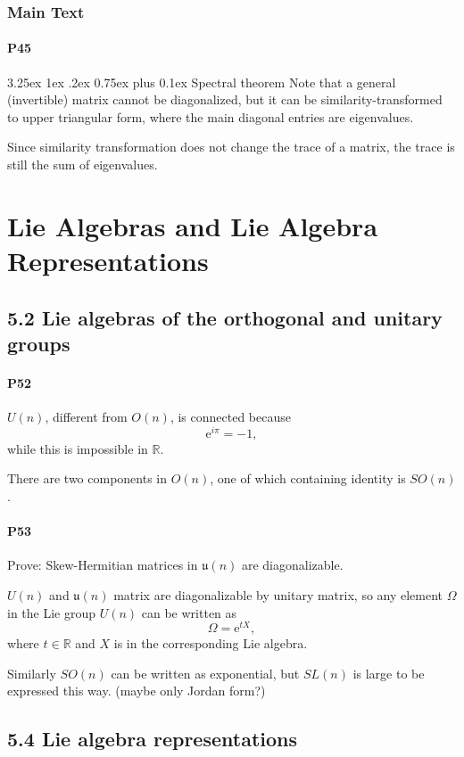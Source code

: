 \documentclass[12pt, letterpaper]{article}
\makeatletter
\renewcommand\subparagraph{\@startsection{subparagraph}{5}{\parindent}%
	{3.25ex \@plus1ex \@minus .2ex}%
	{0.75ex plus 0.1ex}%
	{\normalfont\normalsize\bfseries}}
\newcommand{\re}{\mathbb{R}}
\newcommand{\ee}{\mathrm{e}}
\newcommand{\red}[1]{{\color{red} #1}}
\newcommand{\blue}[1]{{\color{blue} #1}}
\theoremstyle{definition}
\theoremstyle{remark}
\theoremstyle{definition}
\theoremstyle{plain}
\makeatother
\begin{document}
	\subsubsection*{Main Text}

	\paragraph{P45}
	\subparagraph{Spectral theorem}
	\blue{Note that a general (invertible) matrix cannot be diagonalized}, but it can be similarity-transformed to upper triangular form,
	where the main diagonal entries are eigenvalues.
	
	Since similarity transformation does not change the trace of a matrix, the trace is still the sum of eigenvalues.
	
	\section{Lie Algebras and Lie Algebra Representations}
	\subsection*{5.2 Lie algebras of the orthogonal and unitary groups}
	\paragraph{P52}
	
	$U(n)$, different from $O(n)$, is connected because
	\[\ee^{i\pi}=-1, \]
	while this is impossible in $\re$.
	
	There are two components in $O(n)$, one of which containing identity is $SO(n)$.
	
	\paragraph{P53}
	
	\red{Prove: Skew-Hermitian matrices in $\mathfrak{u}(n)$ are diagonalizable.}
	
	$U(n)$ and $\mathfrak{u}(n)$ matrix are diagonalizable by unitary matrix, %
	so any element $\Omega$ in the Lie group $U(n)$
	can be written as
	\[\Omega=\ee^{tX}, \]
	where $t\in\re$ and $X$ is in the corresponding Lie algebra.
	
	Similarly $SO(n)$ can be written as exponential, but $SL(n)$ is large to be expressed this way.
	(maybe only Jordan form?)
	
	\subsection*{5.4 Lie algebra representations}
\end{document}
